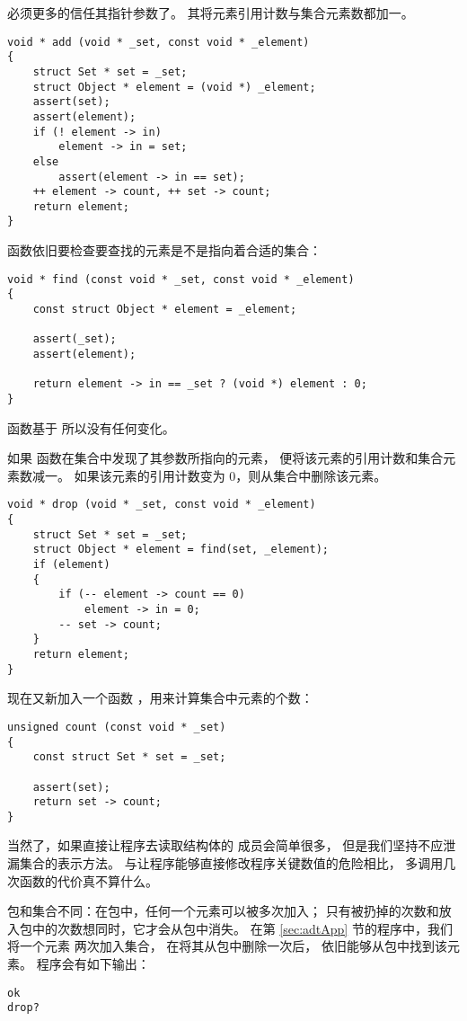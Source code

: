 必须更多的信任其指针参数了。
其将元素引用计数与集合元素数都加一。
\begin{lstlisting}
void * add (void * _set, const void * _element)
{
	struct Set * set = _set;
	struct Object * element = (void *) _element;
	assert(set);
	assert(element);
	if (! element -> in)
		element -> in = set;
	else
		assert(element -> in == set);
	++ element -> count, ++ set -> count;
	return element;
}
\end{lstlisting}
 函数依旧要检查要查找的元素是不是指向着合适的集合：
\begin{lstlisting}
void * find (const void * _set, const void * _element)
{
	const struct Object * element = _element;

	assert(_set);
	assert(element);

	return element -> in == _set ? (void *) element : 0;
}
\end{lstlisting}
 函数基于  所以没有任何变化。

如果  函数在集合中发现了其参数所指向的元素，
便将该元素的引用计数和集合元素数减一。
如果该元素的引用计数变为 0，则从集合中删除该元素。
\begin{lstlisting}
void * drop (void * _set, const void * _element)
{
	struct Set * set = _set;
	struct Object * element = find(set, _element);
	if (element)
	{
		if (-- element -> count == 0)
			element -> in = 0;
		-- set -> count;
	}
	return element;
}
\end{lstlisting}

现在又新加入一个函数 ，用来计算集合中元素的个数：
\begin{lstlisting}
unsigned count (const void * _set)
{
	const struct Set * set = _set;

	assert(set);
	return set -> count;
}
\end{lstlisting}
当然了，如果直接让程序去读取结构体的  成员会简单很多，
但是我们坚持不应泄漏集合的表示方法。
与让程序能够直接修改程序关键数值的危险相比，
多调用几次函数的代价真不算什么。

包和集合不同：在包中，任何一个元素可以被多次加入；
只有被扔掉的次数和放入包中的次数想同时，它才会从包中消失。
在第 \ref{sec:adtApp} 节的程序中，我们将一个元素  两次加入集合，
在将其从包中删除一次后， 依旧能够从包中找到该元素。
程序会有如下输出：
\begin{lstlisting}
ok
drop?
\end{lstlisting}

